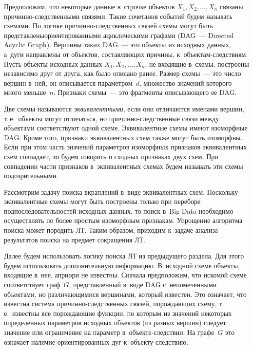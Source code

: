 \begin{multicols}{2}
  Предположим, что некоторые данные в~строчке объектов $X_1, X_2, \ldots , 
X_n$ связаны при\-чин\-но-след\-ст\-вен\-ны\-ми связями. Такие сочетания 
событий будем\linebreak
 называть схемами. По логике при\-чин\-но-след\-ст\-венных 
связей схемы могут быть представлены\linebreak ориентированными ациклическими 
графами (DAG~--- Directed Acyclic Graph). Вершины таких DAG~--- это объекты 
из исходных данных, а~дуги направлены от объектов, составляющих причины, 
к~объ\-ек\-там-след\-ст\-ви\-ям. Пусть объекты исходных данных $X_1, X_2, \ldots 
, X_n$, не входящие в~схемы, построены независимо друг от друга, как было 
описано ранее. Размер схемы~--- это число вершин в~ней, он описывается 
параметром~$d$, множество значений которого много меньше~$n$. Признаки 
схемы~--- это фрагменты описывающего ее DAG. 
  
  Две схемы называются \textit{эквивалентными}, если они отличаются именами 
вершин, т.\,е.\ объекты могут отличаться, но при\-чин\-но-след\-ст\-вен\-ные 
связи между объектами соответствуют одной схеме. Эквивалентные схемы имеют 
изоморфные DAG. Кроме того, признаки эквивалентных схем также могут быть 
изоморфны. Если при этом часть значений параметров изоморфных признаков 
эквивалентных схем совпадает, то будем говорить о сходных признаках двух схем. 
При совпадении части признаков в~эквивалентных схемах будем называть эти 
схемы подозрительными.
  
  Рассмотрим задачу поиска вкраплений в~виде эквивалентных схем. Поскольку 
эквивалентные схемы могут быть построены только при переборе 
подпоследовательностей исходных данных, то поиск в~Big Data необходимо 
осуществлять по более простым изоморфным признакам. Упрощение алгоритма 
поиска может породить ЛТ. Таким образом, приходим к~задаче анализа 
результатов поиска на предмет сокращения ЛТ. 
  
  Далее будем использовать логику поиска ЛТ из предыдущего раздела. Для этого 
будем использовать дополнительную информацию. В~исходной схеме объекты, 
входящие в~нее, априори не известны. Сначала предположим, что искомой схеме 
соответствует граф~$G$, представленный в~виде DAG с~непомеченными 
объектами, но различающимися вершинами, который известен. Это означает, что 
известна система при\-чин\-но-след\-ст\-вен\-ных связей, порождающих схему, 
т.\,е.\ известны все по\-рож\-да\-ющие функции, по которым из значений некоторых 
определенных параметров исходных объектов (из разных вершин) следует 
значение или ограничение на параметр в~объ\-ек\-те-след\-ст\-вии. На графе~$G$ 
это означает наличие ориентированных дуг к~объ\-ек\-ту-след\-ст\-вию.
  

\end{multicols}
